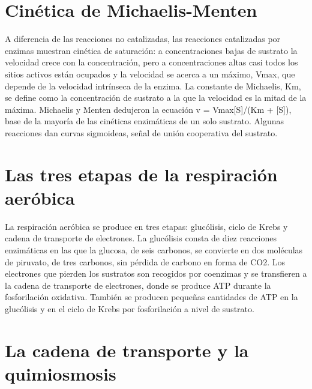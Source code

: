 \documentclass{book}
\begin{document}

\section{Cinética de Michaelis-Menten}

A diferencia de las reacciones no catalizadas, las reacciones catalizadas por enzimas muestran cinética de saturación: a concentraciones bajas de sustrato la velocidad crece con la concentración, pero a concentraciones altas casi todos los sitios activos están ocupados y la velocidad se acerca a un máximo, Vmax, que depende de la velocidad intrínseca de la enzima. La constante de Michaelis, Km, se define como la concentración de sustrato a la que la velocidad es la mitad de la máxima. Michaelis y Menten dedujeron la ecuación v = Vmax[S]/(Km + [S]), base de la mayoría de las cinéticas enzimáticas de un solo sustrato. Algunas reacciones dan curvas sigmoideas, señal de unión cooperativa del sustrato.


\section{Las tres etapas de la respiración aeróbica}

La respiración aeróbica se produce en tres etapas: glucólisis, ciclo de Krebs y cadena de transporte de electrones. La glucólisis consta de diez reacciones enzimáticas en las que la glucosa, de seis carbonos, se convierte en dos moléculas de piruvato, de tres carbonos, sin pérdida de carbono en forma de CO2. Los electrones que pierden los sustratos son recogidos por coenzimas y se transfieren a la cadena de transporte de electrones, donde se produce ATP durante la fosforilación oxidativa. También se producen pequeñas cantidades de ATP en la glucólisis y en el ciclo de Krebs por fosforilación a nivel de sustrato.


\section{La cadena de transporte y la quimiosmosis}
\end{document}
